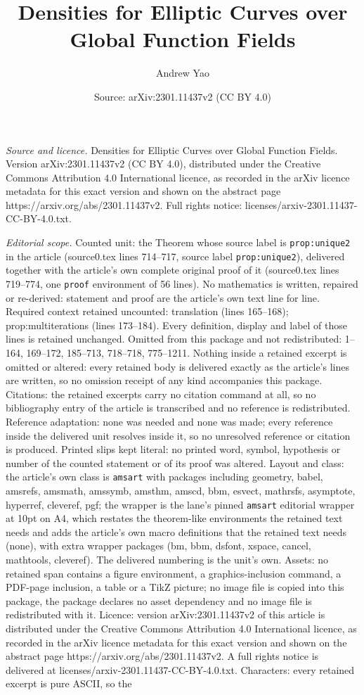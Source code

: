 \documentclass[10pt,a4paper]{amsart}
\title[Densities for Elliptic Curves over Global Function Fields]{Densities for Elliptic Curves over Global Function Fields}
\author{Andrew Yao}
\date{Source: arXiv:2301.11437v2 (CC BY 4.0)}
\begin{document}
\maketitle

\noindent\emph{Source and licence.} Densities for Elliptic Curves over Global Function Fields. Version arXiv:2301.11437v2 (CC BY 4.0), distributed under the Creative Commons Attribution 4.0 International licence, as recorded in the arXiv licence metadata for this exact version and shown on the abstract page https://arxiv.org/abs/2301.11437v2. Full rights notice: licenses/arxiv-2301.11437-CC-BY-4.0.txt.\par\smallskip

\noindent\textit{Editorial scope.} Counted unit: the Theorem whose source label is \texttt{prop:unique2} in the article (source0.tex lines 714--717, source label \texttt{prop:unique2}), delivered together with the article's own complete original proof of it (source0.tex lines 719--774, one \texttt{proof} environment of 56 lines). No mathematics is written, repaired or re-derived: statement and proof are the article's own text line for line. Required context retained uncounted: translation (lines 165--168); prop:multiterations (lines 173--184). Every definition, display and label of those lines is retained unchanged. Omitted from this package and not redistributed: 1--164, 169--172, 185--713, 718--718, 775--1211. Nothing inside a retained excerpt is omitted or altered: every retained body is delivered exactly as the article's lines are written, so no omission receipt of any kind accompanies this package. Citations: the retained excerpts carry no citation command at all, so no bibliography entry of the article is transcribed and no reference is redistributed. Reference adaptation: none was needed and none was made; every reference inside the delivered unit resolves inside it, so no unresolved reference or citation is produced. Printed slips kept literal: no printed word, symbol, hypothesis or number of the counted statement or of its proof was altered. Layout and class: the article's own class is \texttt{amsart} with packages including geometry, babel, amsrefs, amsmath, amssymb, amsthm, amscd, bbm, esvect, mathrsfs, asymptote, hyperref, cleveref, pgf; the wrapper is the lane's pinned \texttt{amsart} editorial wrapper at 10pt on A4, which restates the theorem-like environments the retained text needs and adds the article's own macro definitions that the retained text needs (none), with extra wrapper packages (bm, bbm, dsfont, xspace, cancel, mathtools, cleveref). The delivered numbering is the unit's own. Assets: no retained span contains a figure environment, a graphics-inclusion command, a PDF-page inclusion, a table or a TikZ picture; no image file is copied into this package, the package declares no asset dependency and no image file is redistributed with it. Licence: version arXiv:2301.11437v2 of this article is distributed under the Creative Commons Attribution 4.0 International licence, as recorded in the arXiv licence metadata for this exact version and shown on the abstract page https://arxiv.org/abs/2301.11437v2. A full rights notice is delivered at licenses/arxiv-2301.11437-CC-BY-4.0.txt. Characters: every retained excerpt is pure ASCII, so the 
\end{document}
